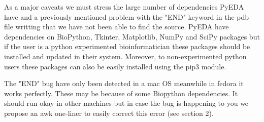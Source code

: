 \documentclass[12pt]{article}
\begin{document}
As a major caveats we must stress the large number of dependencies PyEDA have and a previously mentioned problem with the "END" keyword in the pdb file writting that we have not been able to find the source. PyEDA have dependencies on  BioPython\citep{Cock2009}, Tkinter, Matplotlib\citep{Hunter2007}, NumPy and SciPy\citep{VanderWalt2011} packages but if the user is a python experimented bioinformatician these packages should be installed and updated in their system. Moreover, to non-experimented python users these packages can also be easily installed using the pip3 module. 

The "END" bug have only been detected in a mac OS meanwhile in fedora it works perfectly. These may be because of some Biopython dependencies. It should run okay in other machines but in case the bug is happening to you we propose an awk one-liner to easily correct this error (see section 2). 

\clearpage
\listoffigures

\end{document}
